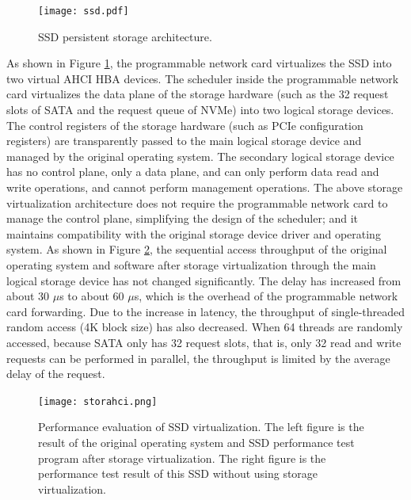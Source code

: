 \begin{figure}[htbp]
	\centering
	\texttt{[image: ssd.pdf]}
	\caption{SSD persistent storage architecture.}
	\label{kvdirect:fig:ssd}
\end{figure}

As shown in Figure \ref{kvdirect:fig:ssd}, the programmable network card virtualizes the SSD into two virtual AHCI HBA devices.
The scheduler inside the programmable network card virtualizes the data plane of the storage hardware (such as the 32 request slots of SATA and the request queue of NVMe) into two logical storage devices.
The control registers of the storage hardware (such as PCIe configuration registers) are transparently passed to the main logical storage device and managed by the original operating system.
The secondary logical storage device has no control plane, only a data plane, and can only perform data read and write operations, and cannot perform management operations.
The above storage virtualization architecture does not require the programmable network card to manage the control plane, simplifying the design of the scheduler; and it maintains compatibility with the original storage device driver and operating system.
As shown in Figure \ref{kvdirect:fig:ssd-benchmark}, the sequential access throughput of the original operating system and software after storage virtualization through the main logical storage device has not changed significantly. The delay has increased from about 30 $\mu$s to about 60 $\mu$s, which is the overhead of the programmable network card forwarding. Due to the increase in latency, the throughput of single-threaded random access (4K block size) has also decreased. When 64 threads are randomly accessed, because SATA only has 32 request slots, that is, only 32 read and write requests can be performed in parallel, the throughput is limited by the average delay of the request.

\begin{figure}[htbp]
	\centering
	\texttt{[image: storahci.png]}
	\caption{Performance evaluation of SSD virtualization. The left figure is the result of the original operating system and SSD performance test program after storage virtualization. The right figure is the performance test result of this SSD without using storage virtualization.}
	\label{kvdirect:fig:ssd-benchmark}
\end{figure}

